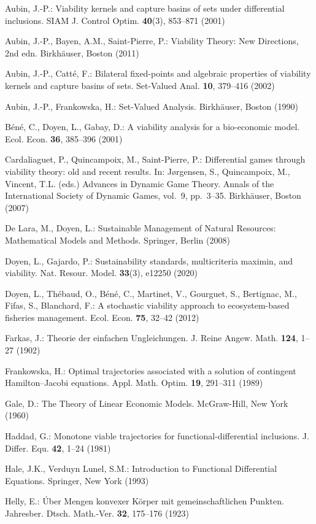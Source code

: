\documentclass[11pt]{article}
\theoremstyle{definition}
\begin{document}
Aubin, J.-P.: Viability kernels and capture basins of sets under differential inclusions. SIAM J. Control Optim. \textbf{40}(3), 853--871 (2001)

Aubin, J.-P., Bayen, A.M., Saint-Pierre, P.: Viability Theory: New Directions, 2nd edn. Birkh\"auser, Boston (2011)

Aubin, J.-P., Catt\'e, F.: Bilateral fixed-points and algebraic properties of viability kernels and capture basins of sets. Set-Valued Anal. \textbf{10}, 379--416 (2002)

Aubin, J.-P., Frankowska, H.: Set-Valued Analysis. Birkh\"auser, Boston (1990)

B\'en\'e, C., Doyen, L., Gabay, D.: A viability analysis for a bio-economic
model. Ecol. Econ. \textbf{36}, 385--396 (2001)

Cardaliaguet, P., Quincampoix, M., Saint-Pierre, P.: Differential games
through viability theory: old and recent results. In: J\o{}rgensen, S.,
Quincampoix, M., Vincent, T.L. (eds.) Advances in Dynamic Game Theory.
Annals of the International Society of Dynamic Games, vol.~9, pp.~3--35.
Birkh\"auser, Boston (2007)

De Lara, M., Doyen, L.: Sustainable Management of Natural Resources:
Mathematical Models and Methods. Springer, Berlin (2008)

Doyen, L., Gajardo, P.: Sustainability standards, multicriteria maximin,
and viability. Nat. Resour. Model. \textbf{33}(3), e12250 (2020)

Doyen, L., Th\'ebaud, O., B\'en\'e, C., Martinet, V., Gourguet, S., Bertignac,
M., Fifas, S., Blanchard, F.: A stochastic viability approach to
ecosystem-based fisheries management. Ecol. Econ. \textbf{75}, 32--42
(2012)

Farkas, J.: Theorie der einfachen Ungleichungen. J. Reine Angew. Math.
\textbf{124}, 1--27 (1902)

Frankowska, H.: Optimal trajectories associated with a solution of
contingent Hamilton--Jacobi equations. Appl. Math. Optim. \textbf{19},
291--311 (1989)

Gale, D.: The Theory of Linear Economic Models. McGraw-Hill, New York
(1960)

Haddad, G.: Monotone viable trajectories for functional-differential
inclusions. J. Differ. Equ. \textbf{42}, 1--24 (1981)

Hale, J.K., Verduyn Lunel, S.M.: Introduction to Functional Differential
Equations. Springer, New York (1993)

Helly, E.: \'Uber Mengen konvexer K\"orper mit gemeinschaftlichen Punkten.
Jahresber. Dtsch. Math.-Ver. \textbf{32}, 175--176 (1923)
\end{document}
